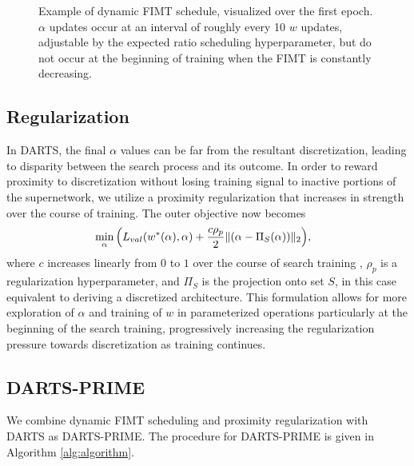 \documentclass[letterpaper]{article} \usepackage{aaai22}  \usepackage{times}  \usepackage{helvet}  \usepackage{courier}  \usepackage[hyphens]{url}  \usepackage{graphicx} \urlstyle{rm} \def\UrlFont{\rm}  \usepackage{natbib}  \usepackage{caption} \DeclareCaptionStyle{ruled}{labelfont=normalfont,labelsep=colon,strut=off} \frenchspacing  \setlength{\pdfpagewidth}{8.5in}  \setlength{\pdfpageheight}{11in}  \usepackage{algorithm}
\DeclarePairedDelimiter{\norm}{\lVert}{\rVert}
\begin{document}
\begin{figure}[ht!]
\caption{Example of dynamic FIMT schedule, visualized over the first epoch. $\alpha$ updates occur at an interval of roughly every 10 $w$ updates, adjustable by the expected ratio scheduling hyperparameter, but do not occur at the beginning of training when the FIMT is constantly decreasing.}
\label{fig:fimt}
\end{figure}

\subsection{Regularization}
In DARTS, the final $\alpha$ values can be far from the resultant discretization, leading to disparity between the search process and its outcome. In order to reward proximity to discretization without losing training signal to inactive portions of the supernetwork, we utilize a proximity regularization that increases in strength over the course of training. The outer objective now becomes
\begin{align}
    &\min_\alpha\Big(L_{val}(w^*(\alpha),\alpha)+\frac{c\rho_{p}}2\norm{(\alpha-\Pi_S(\alpha))}_2\Big),  \label{eq:proxl}
\end{align}
where $c$ increases linearly from $0$ to $1$ over the course of search training , $\rho_{p}$ is a regularization hyperparameter, and $\Pi_S$ is the projection onto set $S$, in this case equivalent to deriving a discretized architecture. This formulation allows for more exploration of $\alpha$ and training of $w$ in parameterized operations particularly at the beginning of the search training, progressively increasing the regularization pressure towards discretization as training continues.

\subsection{DARTS-PRIME}
We combine dynamic FIMT scheduling and proximity regularization with DARTS as DARTS-PRIME. The procedure for DARTS-PRIME is given in Algorithm \ref{alg:algorithm}.
\end{document}
